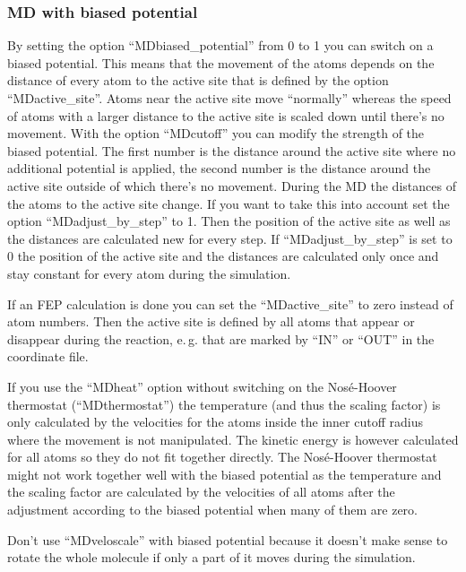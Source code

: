 \documentclass[10pt,a4paper]{article} %
\begin{document}
	\subsubsection{MD with biased potential}
	
	By setting the option ``MDbiased\_potential'' from 0 to 1 you can switch on a biased potential. This means that the movement of the atoms depends on the distance of every atom to the active site that is defined by the option ``MDactive\_site''. Atoms near the active site move ``normally'' whereas the speed of atoms with a larger distance to the active site is scaled down until there's no movement. With the option ``MDcutoff'' you can modify the strength of the biased potential. The first number is the distance around the active site where no additional potential is applied, the second number is the distance around the active site outside of which there's no movement. During the MD the distances of the atoms to the active site change. If you want to take this into account set the option ``MDadjust\_by\_step'' to 1. Then the position of the active site as well as the distances are calculated new for every step. If ``MDadjust\_by\_step'' is set to 0 the position of the active site and the distances are calculated only once and stay constant for every atom during the simulation. 
	
If an FEP calculation is done you can set the ``MDactive\_site'' to zero instead of atom numbers. Then the active site is defined by all atoms that appear or disappear during the reaction, e.\,g. that are marked by ``IN'' or ``OUT'' in the coordinate file. 
	
If you use the ``MDheat'' option without switching on the Nosé-Hoover thermostat (``MDthermostat'') the temperature (and thus the scaling factor) is only calculated by the velocities for the atoms inside the inner cutoff radius where the movement is not manipulated. The kinetic energy is however calculated for all atoms so they do not fit together directly. The Nosé-Hoover thermostat might not work together well with the biased potential as the temperature and the scaling factor are calculated by the velocities of all atoms after the adjustment according to the biased potential when many of them are zero.

Don't use ``MDveloscale'' with biased potential because it doesn't make sense to rotate the whole molecule if only a part of it moves during the simulation.


	
	
\end{document}
